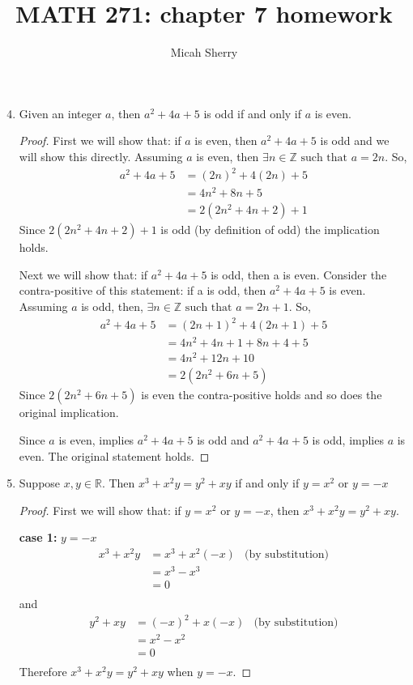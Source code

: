 \documentclass{article}
\title{MATH 271: chapter 7 homework}
\author{Micah Sherry}
\newcommand{\ints}{\mathbb{Z}}
\newcommand{\reals}{\mathbb{R}}
\newcommand{\st}{\text{ such that }}
\begin{document}
	\maketitle
	
	\begin{enumerate}
		\setcounter{enumi}{3}
		\item Given an integer $a$, then $a^2 +4a+5$ is odd if and only if $a$ is even.
		\begin{proof}
			First we will show that: if $a$ is even, then $a^2 +4a+5$ is odd and we will show this directly.
			Assuming $a$ is even, then $\exists n \in \ints \st a=2n$. 
			So, 
			\begin{align*}
				a^2 + 4a + 5 &= (2n)^2 + 4(2n) + 5\\
					 &= 4n^2 + 8n + 5\\
					 &= 2(2n^2 + 4n + 2) + 1
			\end{align*}
			 Since  $2(2n^2 + 4n + 2) + 1$ is odd (by definition of odd) the implication holds.
			 
			 Next we will show that: 
			 	if $a^2 +4a+5$ is odd, then a is even.
			  Consider the contra-positive of this statement: 
			  	if a is odd, then $a^2 +4a+5$ is even.
			  Assuming $a$ is odd, then, $\exists n \in \ints \st a=2n+1$. 
			  So, 
			  \begin{align*}
			  	a^2 + 4a + 5 &= (2n+1)^2 + 4(2n+1) + 5\\
			  		&=  4n^2+4n+1 +8n + 4 + 5\\
			  		&=  4n^2+12n +10\\
			  		&=  2(2n^2+6n +5)
			  \end{align*}
			  Since $2(2n^2+6n +5)$ is even the contra-positive holds and so does the original implication.
			  
			Since $a$ is even, implies $a^2 +4a+5$ is odd and $a^2 +4a+5$ is odd, implies $a$ is even. The original statement holds.
			  
			
		\end{proof}
		
		\setcounter{enumi}{5}
		\item Suppose $x, y \in \reals $. Then  $x^3 + x^2y=y^2 +xy$ if and only if $y = x^2 $ or $y = -x$ 
		\begin{proof}
			First we will show that: if $y = x^2$ or $y = -x$, then $x^3 + x^2y=y^2 +xy$.
			
			\textbf{case 1:} $y = -x$ \\ 
			\begin{align*}
				x^3+x^2y &= x^3 + x^2(-x) & \text{(by substitution)}\\
						 &=  x^3 - x^3 \\
						 &= 0\\
			\end{align*}
			and
			\begin{align*}
				y^2 +xy&= (-x)^2+x(-x) & \text{(by substitution)}\\
				&=  x^2 - x^2 \\
				&= 0\\
			\end{align*}
			Therefore $x^3+x^2y = y^2 +xy$ when $y = -x$.
			

\end{proof}
\end{enumerate}
\end{document}
